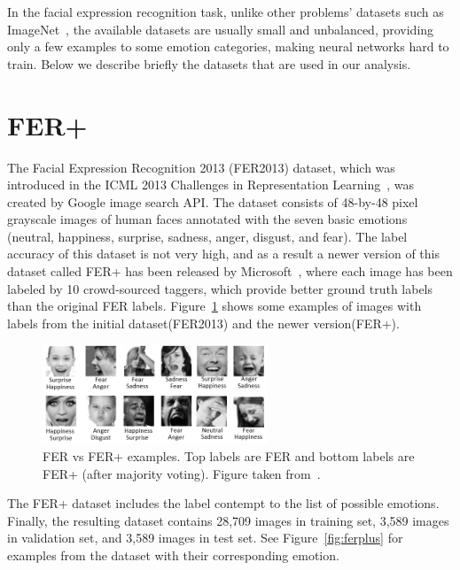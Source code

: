 In the facial expression recognition task, unlike other problems' datasets such as ImageNet~\cite{krizhevsky2012imagenet}, the available datasets are usually small and unbalanced, providing only a few examples to some emotion categories, making neural networks hard to train. Below we describe briefly the datasets that are used in our analysis.

\section{FER+}
The Facial Expression Recognition 2013 (FER2013) dataset, which was introduced in the ICML 2013 Challenges in Representation Learning~\cite{tang2013challenges}, was created by Google image search API. The dataset consists of 48-by-48 pixel grayscale images of human faces annotated with the seven basic emotions (neutral, happiness, surprise, sadness, anger, disgust, and fear). The label accuracy of this dataset is not very high, and as a result a newer version of this dataset called FER+ has been released by Microsoft~\cite{barsoum2016training}, where each image has been labeled by 10 crowd-sourced taggers, which provide better ground truth labels than the original FER labels. Figure~\ref{fig:FERPLUS_FER} shows some examples of images with labels from the initial dataset(FER2013) and the newer version(FER+).

\begin{figure}[]
    \begin{center}
    \includegraphics[width=0.6\textwidth]{images/FERPLUS_FER.png}
    \end{center}
    \caption{FER vs FER+ examples. Top labels are FER and bottom labels are FER+ (after majority voting). Figure taken from~\cite{barsoum2016training}.} \label{fig:FERPLUS_FER}
\end{figure}

 The FER+ dataset includes the label contempt to the list of possible emotions. Finally, the resulting dataset contains 28,709 images in training set, 3,589 images in validation set, and 3,589 images in test set. See Figure~\ref{fig:ferplus} for examples from the dataset with their corresponding emotion. 
 
